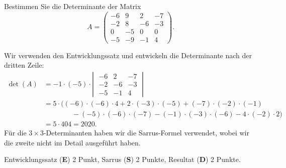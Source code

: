 Bestimmen Sie die Determinante der Matrix
\[
A=\begin{pmatrix}
  -6&  9&  2& -7\\
  -2&  8& -6& -3\\
   0& -5&  0&  0\\
  -5& -9& -1&  4
\end{pmatrix}.
\]

\begin{loesung}
Wir verwenden den Entwicklungssatz und entwickeln die Determinante nach der
dritten Zeile:
\begin{align*}
\det(A)
&=
-1\cdot(-5)\cdot \left|\;\begin{matrix}
  -6&  2& -7\\
  -2& -6& -3\\
  -5& -1&  4
\end{matrix}\;\right|
\\
&=
5\cdot\bigl(
(-6)\cdot(-6)\cdot 4 + 2\cdot(-3)\cdot(-5)+(-7)\cdot(-2)\cdot(-1)
\\
&\qquad\qquad
- (-5)\cdot(-6)\cdot(-7) - (-1)\cdot(-3)\cdot(-6) - 4\cdot(-2)\cdot 2
\bigr)
\\
&=
5\cdot 404
=
2020.
\end{align*}
Für die $3\times 3$-Determinanten haben wir die Sarrus-Formel verwendet, wobei
wir die zweite nicht im Detail ausgeführt haben.
\end{loesung}

\begin{bewertung}
Entwicklungssatz ({\bf E}) 2 Punkt,
Sarrus ({\bf S}) 2 Punkte,
Resultat ({\bf D}) 2 Punkte.
\end{bewertung}


